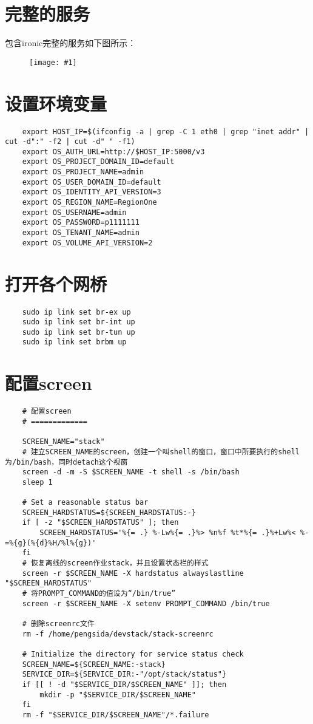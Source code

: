 \documentclass[a4paper,left=1.5cm,right=1.5cm,11pt]{article}
\newcommand{\fic}[1]{\begin{figure}[H]
		\center
		\texttt{[image: \#1]}
	\end{figure}}
\begin{document}
\tableofcontents

\clearpage

\section{完整的服务}
	包含ironic完整的服务如下图所示：
	\fic{1.png}

\section{设置环境变量}
	\begin{lstlisting}
	export HOST_IP=$(ifconfig -a | grep -C 1 eth0 | grep "inet addr" | cut -d":" -f2 | cut -d" " -f1)
	export OS_AUTH_URL=http://$HOST_IP:5000/v3
	export OS_PROJECT_DOMAIN_ID=default         
	export OS_PROJECT_NAME=admin     
	export OS_USER_DOMAIN_ID=default
	export OS_IDENTITY_API_VERSION=3
	export OS_REGION_NAME=RegionOne
	export OS_USERNAME=admin
	export OS_PASSWORD=p1111111        
	export OS_TENANT_NAME=admin     
	export OS_VOLUME_API_VERSION=2
	\end{lstlisting}

\section{打开各个网桥}
	\begin{lstlisting}
	sudo ip link set br-ex up
	sudo ip link set br-int up
	sudo ip link set br-tun up
	sudo ip link set brbm up
	\end{lstlisting}

\section{配置screen}
	\begin{lstlisting}
	# 配置screen
	# =============
	
	SCREEN_NAME="stack"
	# 建立SCREEN_NAME的screen，创建一个叫shell的窗口，窗口中所要执行的shell为/bin/bash，同时detach这个视窗
	screen -d -m -S $SCREEN_NAME -t shell -s /bin/bash
    sleep 1

    # Set a reasonable status bar
    SCREEN_HARDSTATUS=${SCREEN_HARDSTATUS:-}
    if [ -z "$SCREEN_HARDSTATUS" ]; then
        SCREEN_HARDSTATUS='%{= .} %-Lw%{= .}%> %n%f %t*%{= .}%+Lw%< %-=%{g}(%{d}%H/%l%{g})'
    fi
	# 恢复离线的screen作业stack，并且设置状态栏的样式
    screen -r $SCREEN_NAME -X hardstatus alwayslastline "$SCREEN_HARDSTATUS"
	# 将PROMPT_COMMAND的值设为“/bin/true”
    screen -r $SCREEN_NAME -X setenv PROMPT_COMMAND /bin/true

	# 删除screenrc文件
	rm -f /home/pengsida/devstack/stack-screenrc

	# Initialize the directory for service status check
	SCREEN_NAME=${SCREEN_NAME:-stack}
    SERVICE_DIR=${SERVICE_DIR:-"/opt/stack/status"}
    if [[ ! -d "$SERVICE_DIR/$SCREEN_NAME" ]]; then
        mkdir -p "$SERVICE_DIR/$SCREEN_NAME"
    fi
    rm -f "$SERVICE_DIR/$SCREEN_NAME"/*.failure
	\end{lstlisting}
\end{document}
